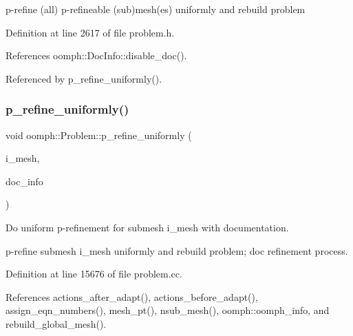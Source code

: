 p-\/refine (all) p-\/refineable (sub)mesh(es) uniformly and rebuild problem 



Definition at line 2617 of file problem.\+h.



References oomph\+::\+Doc\+Info\+::disable\+\_\+doc().



Referenced by p\+\_\+refine\+\_\+uniformly().

\mbox{\label{classoomph_1_1Problem_a04fed27f341b9eb68b5fb3e4673f26f9}} 
\subsubsection{\texorpdfstring{p\+\_\+refine\+\_\+uniformly()}{p\_refine\_uniformly()}\hspace{0.1cm}{\footnotesize\ttfamily [5/6]}}
{\footnotesize\ttfamily void oomph\+::\+Problem\+::p\+\_\+refine\+\_\+uniformly (\begin{DoxyParamCaption}\item[{const unsigned \&}]{i\+\_\+mesh,  }\item[{\hyperlink{classoomph_1_1DocInfo}{Doc\+Info} \&}]{doc\+\_\+info }\end{DoxyParamCaption})}



Do uniform p-\/refinement for submesh i\+\_\+mesh with documentation. 

p-\/refine submesh i\+\_\+mesh uniformly and rebuild problem; doc refinement process. 

Definition at line 15676 of file problem.\+cc.



References actions\+\_\+after\+\_\+adapt(), actions\+\_\+before\+\_\+adapt(), assign\+\_\+eqn\+\_\+numbers(), mesh\+\_\+pt(), nsub\+\_\+mesh(), oomph\+::oomph\+\_\+info, and rebuild\+\_\+global\+\_\+mesh().

\mbox{\label{classoomph_1_1Problem_a33dbab01dfa53e4d005818a2940085b0}} 
